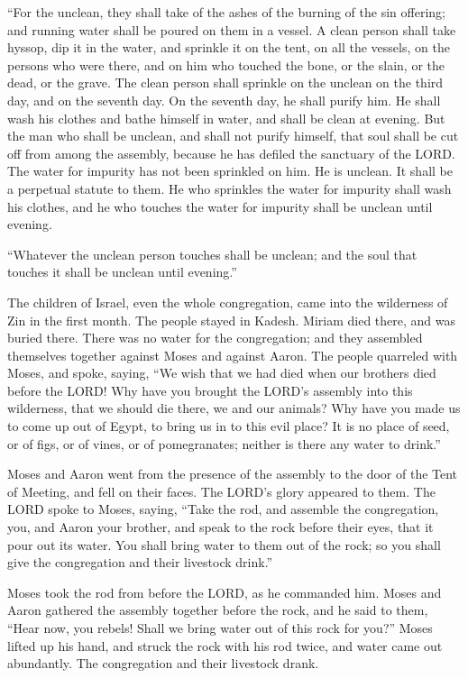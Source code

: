 \myverse{}“For the unclean, they shall take of the ashes of the burning
of the sin offering; and running water shall be poured on them in a vessel.
\myverse{}A clean person shall take hyssop, dip it in the water, and sprinkle it on
the tent, on all the vessels, on the persons who were there, and on him who touched the bone, or the slain,
or the dead, or the grave.
\myverse{}The clean person shall sprinkle on the unclean on the third day, and on the
seventh day. On the seventh day, he shall purify him. He shall wash his clothes and bathe himself in water,
and shall be clean at evening.
\myverse{}But the man who shall be unclean, and shall not purify himself, that soul
shall be cut off from among the assembly, because he has defiled the sanctuary of the LORD. The water
for impurity has not been sprinkled on him. He is unclean.
\myverse{}It shall be a perpetual statute to them. He who sprinkles the water for impurity
shall wash his clothes, and he who touches the water for impurity shall be unclean until evening.


\myverse{}“Whatever the unclean person touches shall be unclean; and the
soul that touches it shall be unclean until evening.”


\mychapter{} \myverse*{}The children of Israel, even the whole congregation, came into
the wilderness of Zin in the first month. The people stayed in Kadesh. Miriam died there, and was buried
there.
\myverse{}There was no water for the congregation; and they assembled themselves together
against Moses and against Aaron.
\myverse{}The people quarreled with Moses, and spoke, saying, “We wish that we had died
when our brothers died before the LORD!
\myverse{}Why have you brought the LORD’s assembly into this wilderness, that we should
die there, we and our animals?
\myverse{}Why have you made us to come up out of Egypt, to bring us in to this evil place?
It is no place of seed, or of figs, or of vines, or of pomegranates; neither is there any water to drink.”


\myverse{}Moses and Aaron went from the presence of the assembly to the
door of the Tent of Meeting, and fell on their faces. The LORD’s glory appeared to them.
\myverse{}The LORD spoke to Moses, saying,
\myverse{}“Take the rod, and assemble the congregation, you, and Aaron your brother,
and speak to the rock before their eyes, that it pour out its water. You shall bring water to them out
of the rock; so you shall give the congregation and their livestock drink.”


\myverse{}Moses took the rod from before the LORD, as he commanded him.
\myverse{}Moses and Aaron gathered the assembly together before the rock, and he said
to them, “Hear now, you rebels! Shall we bring water out of this rock for you?”
\myverse{}Moses lifted up his hand, and struck the rock with his rod twice, and water
came out abundantly. The congregation and their livestock drank.


